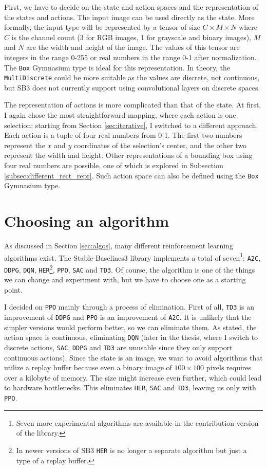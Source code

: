 \documentclass[
  digital,     %
  oneside,     %
  nosansbold,  %
  nocolorbold, %
  lof,         %
  lot,         %
]{fithesis4}
\begin{document}
First, we have to decide on the state and action spaces and the representation of the states and actions. The input image can be used directly as the state. More formally, the input type will be represented by a tensor of size $C\times M \times N$ where $C$ is the channel count (3 for RGB images, 1 for grayscale and binary images), $M$ and $N$ are the width and height of the image. The values of this tensor are integers in the range 0-255 or real numbers in the range 0-1 after normalization. The \texttt{Box} Gymnasium type is ideal for this representation. In theory, the \texttt{MultiDiscrete} could be more suitable as the values are discrete, not continuous, but SB3 does not currently support using convolutional layers on discrete spaces.

The representation of actions is more complicated than that of the state. At first, I again chose the most straightforward mapping, where each action is one selection; starting from Section \ref{sec:iterative}, I switched to a different approach. Each action is a tuple of four real numbers from 0-1. The first two numbers represent the $x$ and $y$ coordinates of the selection's center, and the other two represent the width and height. Other representations of a bounding box using four real numbers are possible, one of which is explored in Subsection \ref{subsec:different_rect_repr}. Such action space can also be defined using the \texttt{Box} Gymnasium type.

\section{Choosing an algorithm}
As discussed in Section \ref{sec:algos}, many different reinforcement learning algorithms exist. The Stable-Baselines3 library implements a total of seven\footnote{Seven more experimental algorithms are available in the contribution version of the library.}: \texttt{A2C}, \texttt{DDPG}, \texttt{DQN}, \texttt{HER}\footnote{In newer versions of SB3 \texttt{HER} is no longer a separate algorithm but just a type of a replay buffer.}, \texttt{PPO}, \texttt{SAC} and \texttt{TD3}. Of course, the algorithm is one of the things we can change and experiment with, but we have to choose one as a starting point.

I decided on \texttt{PPO} mainly through a process of elimination. First of all, \texttt{TD3} is an improvement of \texttt{DDPG} and \texttt{PPO} is an improvement of \texttt{A2C}. It is unlikely that the simpler versions would perform better, so we can eliminate them. As stated, the action space is continuous, eliminating \texttt{DQN} (later in the thesis, where I switch to discrete actions, \texttt{SAC}, \texttt{DDPG} and \texttt{TD3} are unusable since they only support continuous actions). Since the state is an image, we want to avoid algorithms that utilize a replay buffer because even a binary image of $100\times100$ pixels requires over a kilobyte of memory. The size might increase even further, which could lead to hardware bottlenecks. This eliminates \texttt{HER}, \texttt{SAC} and \texttt{TD3}, leaving us only with \texttt{PPO}.
\end{document}
